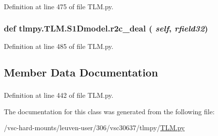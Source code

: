 Definition at line 475 of file TLM.py.\hypertarget{classtlmpy_1_1TLM_1_1S1Dmodel_a5c301014a00ac5124c34413735799224}{
\subsubsection[{r2c\_\-deal}]{\setlength{\rightskip}{0pt plus 5cm}def tlmpy.TLM.S1Dmodel.r2c\_\-deal ( {\em self}, \/   {\em rfield32})}}
\label{classtlmpy_1_1TLM_1_1S1Dmodel_a5c301014a00ac5124c34413735799224}


Definition at line 485 of file TLM.py.

\subsection{Member Data Documentation}
\hypertarget{classtlmpy_1_1TLM_1_1S1Dmodel_a4ca827e20646abc581024cb3d9db8721}{
\subsubsection[{PHI}]{}}
\label{classtlmpy_1_1TLM_1_1S1Dmodel_a4ca827e20646abc581024cb3d9db8721}


Definition at line 442 of file TLM.py.

The documentation for this class was generated from the following file:\begin{DoxyCompactItemize}
\item 
/vsc-\/hard-\/mounts/leuven-\/user/306/vsc30637/tlmpy/\hyperlink{TLM_8py}{TLM.py}\end{DoxyCompactItemize}
